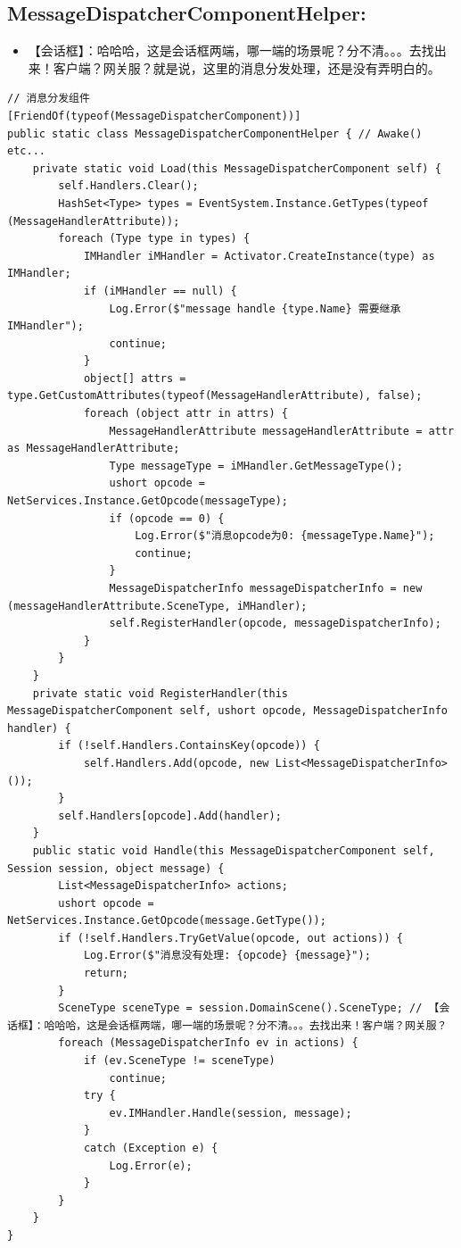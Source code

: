\documentclass[9pt, b5paper]{article}
\begin{document}
\subsection{MessageDispatcherComponentHelper:}
\label{sec-3-15}
\begin{itemize}
\item 【会话框】：哈哈哈，这是会话框两端，哪一端的场景呢？分不清。。。去找出来！客户端？网关服？就是说，这里的消息分发处理，还是没有弄明白的。
\end{itemize}
\begin{verbatim}
// 消息分发组件
[FriendOf(typeof(MessageDispatcherComponent))]
public static class MessageDispatcherComponentHelper { // Awake() etc...
    private static void Load(this MessageDispatcherComponent self) {
        self.Handlers.Clear();
        HashSet<Type> types = EventSystem.Instance.GetTypes(typeof (MessageHandlerAttribute));
        foreach (Type type in types) {
            IMHandler iMHandler = Activator.CreateInstance(type) as IMHandler;
            if (iMHandler == null) {
                Log.Error($"message handle {type.Name} 需要继承 IMHandler");
                continue;
            }
            object[] attrs = type.GetCustomAttributes(typeof(MessageHandlerAttribute), false);
            foreach (object attr in attrs) {
                MessageHandlerAttribute messageHandlerAttribute = attr as MessageHandlerAttribute;
                Type messageType = iMHandler.GetMessageType();
                ushort opcode = NetServices.Instance.GetOpcode(messageType);
                if (opcode == 0) {
                    Log.Error($"消息opcode为0: {messageType.Name}");
                    continue;
                }
                MessageDispatcherInfo messageDispatcherInfo = new (messageHandlerAttribute.SceneType, iMHandler);
                self.RegisterHandler(opcode, messageDispatcherInfo);
            }
        }
    }
    private static void RegisterHandler(this MessageDispatcherComponent self, ushort opcode, MessageDispatcherInfo handler) {
        if (!self.Handlers.ContainsKey(opcode)) {
            self.Handlers.Add(opcode, new List<MessageDispatcherInfo>());
        }
        self.Handlers[opcode].Add(handler);
    }
    public static void Handle(this MessageDispatcherComponent self, Session session, object message) {
        List<MessageDispatcherInfo> actions;
        ushort opcode = NetServices.Instance.GetOpcode(message.GetType());
        if (!self.Handlers.TryGetValue(opcode, out actions)) {
            Log.Error($"消息没有处理: {opcode} {message}");
            return;
        }
        SceneType sceneType = session.DomainScene().SceneType; // 【会话框】：哈哈哈，这是会话框两端，哪一端的场景呢？分不清。。。去找出来！客户端？网关服？
        foreach (MessageDispatcherInfo ev in actions) {
            if (ev.SceneType != sceneType) 
                continue;
            try {
                ev.IMHandler.Handle(session, message);
            }
            catch (Exception e) {
                Log.Error(e);
            }
        }
    }
}
\end{verbatim}
\end{document}
